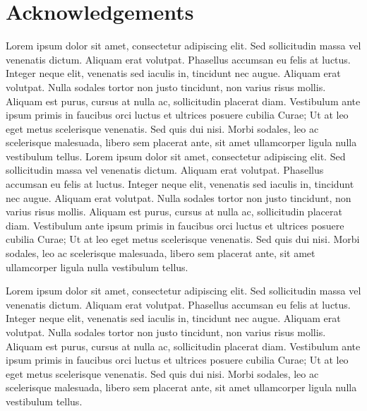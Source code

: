 \chapter*{Acknowledgements}

Lorem ipsum dolor sit amet, consectetur adipiscing elit. Sed sollicitudin massa vel venenatis dictum. Aliquam erat volutpat. Phasellus accumsan eu felis at luctus. Integer neque elit, venenatis sed iaculis in, tincidunt nec augue. Aliquam erat volutpat. Nulla sodales tortor non justo tincidunt, non varius risus mollis. Aliquam est purus, cursus at nulla ac, sollicitudin placerat diam. Vestibulum ante ipsum primis in faucibus orci luctus et ultrices posuere cubilia Curae; Ut at leo eget metus scelerisque venenatis. Sed quis dui nisi. Morbi sodales, leo ac scelerisque malesuada, libero sem placerat ante, sit amet ullamcorper ligula nulla vestibulum tellus.
Lorem ipsum dolor sit amet, consectetur adipiscing elit. Sed sollicitudin massa vel venenatis dictum. Aliquam erat volutpat. Phasellus accumsan eu felis at luctus. Integer neque elit, venenatis sed iaculis in, tincidunt nec augue. Aliquam erat volutpat. Nulla sodales tortor non justo tincidunt, non varius risus mollis. Aliquam est purus, cursus at nulla ac, sollicitudin placerat diam. Vestibulum ante ipsum primis in faucibus orci luctus et ultrices posuere cubilia Curae; Ut at leo eget metus scelerisque venenatis. Sed quis dui nisi. Morbi sodales, leo ac scelerisque malesuada, libero sem placerat ante, sit amet ullamcorper ligula nulla vestibulum tellus.

Lorem ipsum dolor sit amet, consectetur adipiscing elit. Sed sollicitudin massa vel venenatis dictum. Aliquam erat volutpat. Phasellus accumsan eu felis at luctus. Integer neque elit, venenatis sed iaculis in, tincidunt nec augue. Aliquam erat volutpat. Nulla sodales tortor non justo tincidunt, non varius risus mollis. Aliquam est purus, cursus at nulla ac, sollicitudin placerat diam. Vestibulum ante ipsum primis in faucibus orci luctus et ultrices posuere cubilia Curae; Ut at leo eget metus scelerisque venenatis. Sed quis dui nisi. Morbi sodales, leo ac scelerisque malesuada, libero sem placerat ante, sit amet ullamcorper ligula nulla vestibulum tellus.


